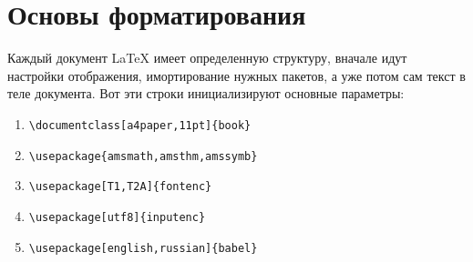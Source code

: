 \documentclass[a4paper,12pt]{article} %
\begin{document}
\section{Основы форматирования}
\hspace{10mm}Каждый документ LaTeX имеет определенную структуру, вначале идут настройки отображения, имортирование нужных пакетов, а уже потом сам текст в теле документа. Вот эти строки инициализируют основные параметры:
\begin{enumerate}
\item \verb|\documentclass[a4paper,11pt]{book}|
\item \verb|\usepackage{amsmath,amsthm,amssymb}|
\item \verb|\usepackage[T1,T2A]{fontenc}|
\item \verb|\usepackage[utf8]{inputenc}|
\item \verb|\usepackage[english,russian]{babel}|
\end{enumerate}
\end{document}
